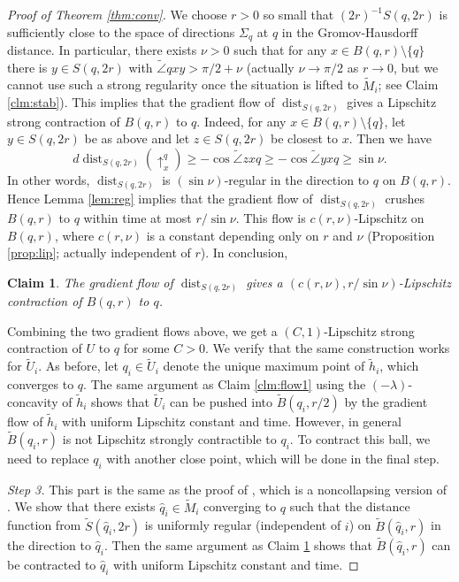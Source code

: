 \documentclass[a4paper,12pt]{amsart}
\theoremstyle{plain}
\newtheorem{clm}[thm]{Claim}
\theoremstyle{definition}
\numberwithin{thm}{section}
\numberwithin{equation}{section}
\DeclareMathOperator{\dist}{dist}
\newcommand{\step}[1]{\medskip\noindent\textit{#1.}}
\begin{document}
\begin{proof}[Proof of Theorem \ref{thm:conv}]
We choose $r>0$ so small that ${(2r)}^{-1}S(q,2r)$ is sufficiently close to the space of directions $\Sigma_q$ at $q$ in the Gromov-Hausdorff distance.
In particular, there exists $\nu>0$ such that for any $x\in B(q,r)\setminus\{q\}$ there is $y\in S(q,2r)$ with $\tilde\angle qxy>\pi/2+\nu$ (actually $\nu\to\pi/2$ as $r\to 0$, but we cannot use such a strong regularity once the situation is lifted to $\tilde M_i$; see Claim \ref{clm:stab}).
This implies that the gradient flow of $\dist_{S(q,2r)}$ gives a Lipschitz strong contraction of $B(q,r)$ to $q$.
Indeed, for any $x\in B(q,r)\setminus\{q\}$, let $y\in S(q,2r)$ be as above and let $z\in S(q,2r)$ be closest to $x$.
Then we have
\[d\dist_{S(q,2r)}(\uparrow_x^q)\ge-\cos\tilde\angle zxq\ge-\cos\tilde\angle yxq\ge\sin\nu.\]
In other words, $\dist_{S(q,2r)}$ is $(\sin\nu)$-regular in the direction to $q$ on $B(q,r)$.
Hence Lemma \ref{lem:reg} implies that the gradient flow of $\dist_{S(q,2r)}$ crushes $B(q,r)$ to $q$ within time at most $r/\sin\nu$.
This flow is $c(r,\nu)$-Lipschitz on $B(q,r)$, where $c(r,\nu)$ is a constant depending only on $r$ and $\nu$ (Proposition \ref{prop:lip}; actually independent of $r$).
In conclusion,

\begin{clm}\label{clm:flow2}
The gradient flow of $\dist_{S(q,2r)}$ gives a $(c(r,\nu),r/\sin\nu)$-Lipschitz contraction of $B(q,r)$ to $q$.
\end{clm}

Combining the two gradient flows above, we get a $(C,1)$-Lipschitz strong contraction of $U$ to $q$ for some $C>0$.
We verify that the same construction works for $\tilde U_i$.
As before, let $q_i\in\tilde U_i$ denote the unique maximum point of $\tilde h_i$, which converges to $q$.
The same argument as Claim \ref{clm:flow1} using the $(-\lambda)$-concavity of $\tilde h_i$ shows that $\tilde U_i$ can be pushed into $\tilde B(q_i,r/2)$ by the gradient flow of $\tilde h_i$ with uniform Lipschitz constant and time.
However, in general $\tilde B(q_i,r)$ is not Lipschitz strongly contractible to $q_i$.
To contract this ball, we need to replace $q_i$ with another close point, which will be done in the final step.

\step{Step 3}
This part is the same as the proof of \cite[3.5]{MY:stab}, which is a noncollapsing version of \cite[3.2]{Y:ess}.
We show that there exists $\hat q_i\in\tilde M_i$ converging to $q$ such that the distance function from $\tilde S(\hat q_i,2r)$ is uniformly regular (independent of $i$) on $\tilde B(\hat q_i,r)$ in the direction to $\hat q_i$.
Then the same argument as Claim \ref{clm:flow2} shows that $\tilde B(\hat q_i,r)$ can be contracted to $\hat q_i$ with uniform Lipschitz constant and time.


\end{proof}
\end{document}
